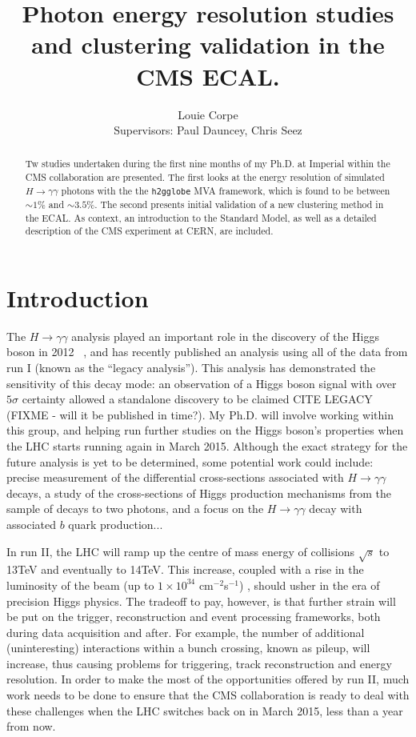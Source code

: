 \documentclass[10pt]{article}
\title{Photon energy resolution studies and clustering validation in the CMS ECAL.}
\author{Louie Corpe \\Supervisors: Paul Dauncey, Chris Seez }
\begin{document}
\maketitle

\renewcommand{\abstractname}{Abstract}
\begin{abstract}
{
Tw studies undertaken during the first nine months of my Ph.D. at Imperial within the CMS collaboration are presented. The first looks at the energy resolution of simulated $H\rightarrow \gamma \gamma$ photons with the the \texttt{h2gglobe} MVA framework, which is found to be between $\sim 1\%$ and $\sim 3.5\%$. The second presents initial validation of a new clustering method in the ECAL. As context, an introduction to the Standard Model, as well as a detailed description of the CMS experiment at CERN, are included.}
\end{abstract}



\tableofcontents

\newpage 
\section{Introduction}

The $H \rightarrow \gamma \gamma$ analysis played an important role in the discovery of the Higgs boson in 2012 ~\cite{CMSHDisc}, and has recently published an analysis using all of the data from run I (known as the ``legacy analysis''). This analysis has demonstrated the sensitivity of this decay mode: an observation of a Higgs boson signal with over $5 \sigma$ certainty allowed a standalone discovery to be claimed CITE LEGACY (FIXME - will it be published in time?). My Ph.D. will involve working within this group, and helping run further studies on the Higgs boson's properties when the LHC starts running again in March 2015. Although the exact strategy for the future analysis is yet to be determined, some potential work could include: precise measurement of the differential cross-sections associated with $H \rightarrow \gamma \gamma$ decays, a study of the cross-sections of Higgs production mechanisms from the sample of decays to two photons, and a focus on the $H \rightarrow \gamma \gamma$ decay with associated $b$ quark production... 

In run II, the LHC will ramp up the centre of mass energy of collisions $\sqrt{s}$ to 13TeV and eventually to 14TeV. This increase, coupled with a rise in the luminosity of the beam (up to  $1\times10^{34}$ cm$^{-2}$s$^{-1}$) , should usher in the era of precision Higgs physics. The tradeoff to pay, however, is that further strain will be put on the trigger, reconstruction and event processing frameworks, both during data acquisition and after. For example, the number of additional (uninteresting) interactions within a bunch crossing, known as pileup, will increase, thus causing problems for triggering, track reconstruction and energy resolution. In order to make the most of the opportunities offered by run II, much work needs to be done to ensure that the CMS collaboration is ready to deal with these challenges when the LHC switches back on in March 2015, less than a year from now.
\end{document}
